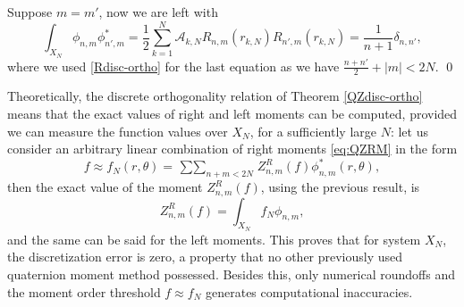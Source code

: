 Suppose $m=m'$, now we are left with
\[
	\int_{X_N} \phi_{n,m} \phi^*_{n',m} = \frac{1}{2} \sum_{k=1}^N \mathcal{A}_{k,N} R_{n,m}(r_{k,N}) R_{n',m}(r_{k,N}) = \frac{1}{n+1}\delta_{n,n'},
\]
where we used \eqref{Rdisc-ortho} for the last equation as we have $\frac{n+n'}{2}+|m| < 2N$.
\qed

Theoretically, the discrete orthogonality relation of Theorem \ref{QZdisc-ortho} means that the exact values of right and left moments can be computed, provided we can measure the function values over $X_N$, for a sufficiently large $N$: let us consider an arbitrary linear combination of right moments \eqref{eq:QZRM} in the form
\[
	f \approx f_N(r,\theta) = \mathop{\sum\sum}_{n+m<2N} Z^R_{n,m}(f) \phi^*_{n,m} (r,\theta),
\]
then the exact value of the moment $Z^R_{n,m}(f)$, using the previous result, is
\[
	Z^R_{n,m}(f) = \int_{X_N} f_N\phi_{n,m},
\]
and the same can be said for the left moments. This proves that for system $X_N$, the discretization error is zero, a property that no other previously used quaternion moment method possessed. Besides this, only numerical roundoffs and the moment order threshold $f \approx f_N$ generates computational inaccuracies.